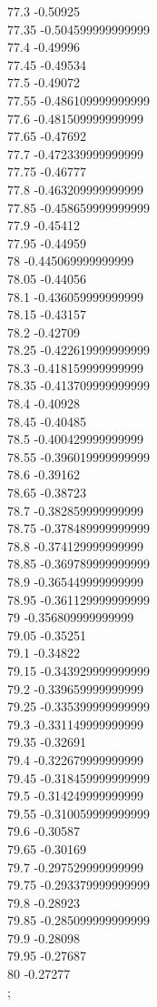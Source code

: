 {77.3	-0.50925\\
77.35	-0.504599999999999\\
77.4	-0.49996\\
77.45	-0.49534\\
77.5	-0.49072\\
77.55	-0.486109999999999\\
77.6	-0.481509999999999\\
77.65	-0.47692\\
77.7	-0.472339999999999\\
77.75	-0.46777\\
77.8	-0.463209999999999\\
77.85	-0.458659999999999\\
77.9	-0.45412\\
77.95	-0.44959\\
78	-0.445069999999999\\
78.05	-0.44056\\
78.1	-0.436059999999999\\
78.15	-0.43157\\
78.2	-0.42709\\
78.25	-0.422619999999999\\
78.3	-0.418159999999999\\
78.35	-0.413709999999999\\
78.4	-0.40928\\
78.45	-0.40485\\
78.5	-0.400429999999999\\
78.55	-0.396019999999999\\
78.6	-0.39162\\
78.65	-0.38723\\
78.7	-0.382859999999999\\
78.75	-0.378489999999999\\
78.8	-0.374129999999999\\
78.85	-0.369789999999999\\
78.9	-0.365449999999999\\
78.95	-0.361129999999999\\
79	-0.356809999999999\\
79.05	-0.35251\\
79.1	-0.34822\\
79.15	-0.343929999999999\\
79.2	-0.339659999999999\\
79.25	-0.335399999999999\\
79.3	-0.331149999999999\\
79.35	-0.32691\\
79.4	-0.322679999999999\\
79.45	-0.318459999999999\\
79.5	-0.314249999999999\\
79.55	-0.310059999999999\\
79.6	-0.30587\\
79.65	-0.30169\\
79.7	-0.297529999999999\\
79.75	-0.293379999999999\\
79.8	-0.28923\\
79.85	-0.285099999999999\\
79.9	-0.28098\\
79.95	-0.27687\\
80	-0.27277\\
};

